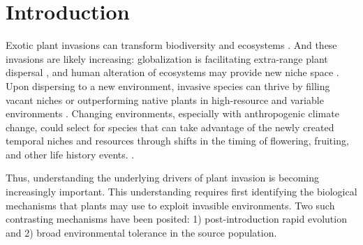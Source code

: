 \documentclass[12pt]{article}\usepackage[]{graphicx}\usepackage[]{color}
\begin{document}
	\section{Introduction} 
	Exotic plant invasions  can transform biodiversity and ecosystems \parencite{Bellard2016, Pejchar2009,Mack2000}. %
And these invasions are likely increasing: globalization is facilitating extra-range plant dispersal \parencite{Helmus2014}, and human alteration of ecosystems may provide new niche space \parencite{Tilman2001, Blois2013,Inouye2008,Harte2015}. Upon dispersing to a new environment, invasive species can thrive by filling vacant niches \parencite{Elton1958} or outperforming native plants in high-resource and variable environments \parencite{Davis2001,Daehler2003}. Changing environments, especially with anthropogenic climate change, could select for species that can take advantage of the newly created temporal niches and resources through shifts in the timing of flowering, fruiting, and other life history events. \parencite{Franks2007}. 
	
	Thus, understanding the underlying drivers of plant invasion is becoming increasingly important. This understanding requires first identifying the biological mechanisms that plants may use to exploit invasible environments. Two such contrasting mechanisms have been posited: 1) post-introduction rapid evolution and 2) broad environmental tolerance in the source population. 
\end{document}
